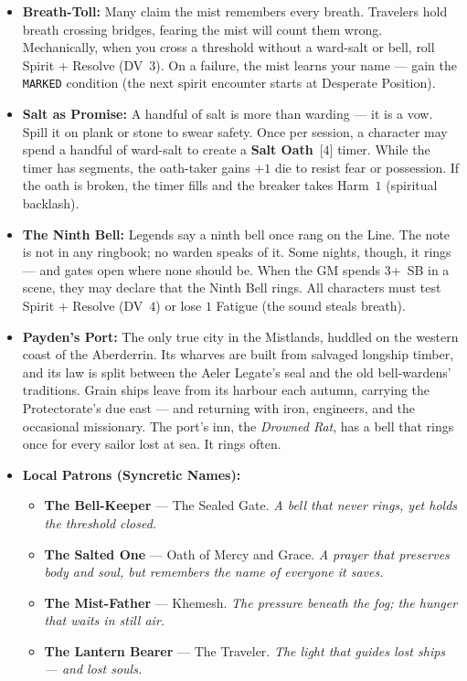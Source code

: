 \begin{itemize}
\item \textbf{Breath-Toll:} Many claim the mist remembers every breath. Travelers hold breath crossing bridges, fearing the mist will count them wrong. Mechanically, when you cross a threshold without a ward-salt or bell, roll Spirit + Resolve (DV~$3$). On a failure, the mist learns your name --- gain the \texttt{MARKED} condition (the next spirit encounter starts at Desperate Position).
\item \textbf{Salt as Promise:} A handful of salt is more than warding --- it is a vow. Spill it on plank or stone to swear safety. Once per session, a character may spend a handful of ward-salt to create a \textbf{Salt Oath}~[$4$] timer. While the timer has segments, the oath-taker gains $+1$ die to resist fear or possession. If the oath is broken, the timer fills and the breaker takes Harm~$1$ (spiritual backlash).
\item \textbf{The Ninth Bell:} Legends say a ninth bell once rang on the Line. The note is not in any ringbook; no warden speaks of it. Some nights, though, it rings --- and gates open where none should be. When the GM spends $3$+~SB in a scene, they may declare that the Ninth Bell rings. All characters must test Spirit + Resolve (DV~$4$) or lose $1$ Fatigue (the sound steals breath).
\item \textbf{Payden's Port:} The only true city in the Mistlands, huddled on the western coast of the Aberderrin. Its wharves are built from salvaged longship timber, and its law is split between the Aeler Legate's seal and the old bell-wardens' traditions. Grain ships leave from its harbour each autumn, carrying the Protectorate's due east --- and returning with iron, engineers, and the occasional missionary. The port's inn, the \emph{Drowned Rat}, has a bell that rings once for every sailor lost at sea. It rings often.
\item \textbf{Local Patrons (Syncretic Names):}
  \begin{itemize}
    \item \textbf{The Bell-Keeper} --- The Sealed Gate. \textit{A bell that never rings, yet holds the threshold closed.}
    \item \textbf{The Salted One} --- Oath of Mercy and Grace. \textit{A prayer that preserves body and soul, but remembers the name of everyone it saves.}
    \item \textbf{The Mist-Father} --- Khemesh. \textit{The pressure beneath the fog; the hunger that waits in still air.}
    \item \textbf{The Lantern Bearer} --- The Traveler. \textit{The light that guides lost ships --- and lost souls.}
  \end{itemize}
\end{itemize}


